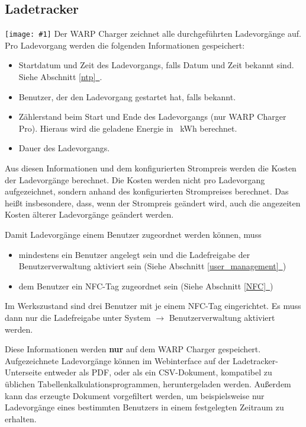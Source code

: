 \documentclass[a4paper,10pt]{article}
\newcommand{\hint}[1]{\begin{tcolorbox}[colback=boxgray,colframe=black,coltext=
white,title=Hinweis,left*=2mm,right*=2mm,boxsep=1mm,bottom=1mm,top=1mm]#1\end{tcolorbox}}
\newcommand{\gfx}[1]{\texttt{[image: \#1]}}
\newcommand*{\fullref}[1]{Abschnitt \hyperref[{#1}]{\ref*{#1}~\nameref*{#1}}}
\begin{document}
\begin{multicols*}{2}
    \newpage
    \section{Ladetracker}\label{charge_tracker}
    \gfx{./img_warp2/resized/web_charge_tracker}
    Der WARP Charger zeichnet alle durchgeführten Ladevorgänge auf. Pro Ladevorgang werden die folgenden Informationen gespeichert:
    \begin{itemize}
     \item Startdatum und Zeit des Ladevorgangs, falls Datum und Zeit bekannt
     sind. Siehe \fullref{ntp}.
     \item Benutzer, der den Ladevorgang gestartet hat, falls bekannt.
     \item Zählerstand beim Start und Ende des Ladevorgangs (nur WARP Charger Pro). Hieraus wird die geladene Energie in \SI{}{\kWh} berechnet.
     \item Dauer des Ladevorgangs.
    \end{itemize}
    Aus diesen Informationen und dem konfigurierten Strompreis werden die Kosten der Ladevorgänge berechnet. Die Kosten werden nicht pro Ladevorgang aufgezeichnet, sondern anhand des konfigurierten Strompreises berechnet. Das heißt insbesondere, dass, wenn der Strompreis geändert wird, auch die angezeiten Kosten älterer Ladevorgänge geändert werden.

    \hint{Damit Ladevorgänge einem Benutzer zugeordnet werden können, muss
        \begin{itemize}
            \item mindestens ein Benutzer angelegt sein und die Lade­freigabe der Benutzerverwaltung aktiviert sein (Siehe \fullref{user_management})
            \item dem Benutzer ein NFC-Tag zugeordnet sein (Siehe \fullref{NFC})
        \end{itemize}
        Im Werkszustand sind drei Benutzer mit je einem NFC-Tag eingerichtet. Es muss dann nur die Lade­freigabe unter System $\rightarrow$  Benutzerverwaltung aktiviert werden.
    }

    Diese Informationen werden \textbf{nur} auf dem WARP Charger gespeichert.
    Aufgezeichnete Ladevorgänge können im Webinterface auf der Ladetracker-Unterseite entweder als PDF, oder als ein CSV-Dokument,
    kompatibel zu üblichen Tabellenkalkulationsprogrammen, heruntergeladen werden. Außerdem kann das erzeugte Dokument
    vorgefiltert werden, um beispielsweise nur Ladevorgänge eines bestimmten Benutzers in einem festgelegten Zeitraum zu erhalten.


\end{multicols*}
\end{document}
